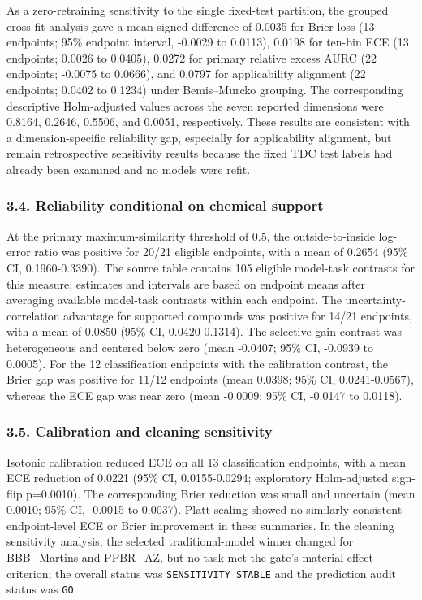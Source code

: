 \documentclass[
]{article}
\begin{document}
As a zero-retraining sensitivity to the single fixed-test partition, the
grouped cross-fit analysis gave a mean signed difference of 0.0035 for Brier
loss (13 endpoints; 95\% endpoint interval, -0.0029 to 0.0113), 0.0198 for
ten-bin ECE (13 endpoints; 0.0026 to 0.0405), 0.0272 for primary relative
excess AURC (22 endpoints; -0.0075 to 0.0666), and 0.0797 for applicability
alignment (22 endpoints; 0.0402 to 0.1234) under Bemis--Murcko grouping.
The corresponding descriptive Holm-adjusted values across the seven reported
dimensions were 0.8164, 0.2646, 0.5506, and 0.0051, respectively. These
results are consistent with a dimension-specific reliability gap, especially
for applicability alignment, but remain retrospective sensitivity results
because the fixed TDC test labels had already been examined and no models were
refit.

\subsubsection{3.4. Reliability conditional on chemical
support}\label{reliability-conditional-on-chemical-support}

At the primary maximum-similarity threshold of 0.5, the
outside-to-inside log-error ratio was positive for 20/21 eligible
endpoints, with a mean of 0.2654 (95\% CI, 0.1960-0.3390). The source
table contains 105 eligible model-task contrasts for this measure;
estimates and intervals are based on endpoint means after averaging
available model-task contrasts within each endpoint. The
uncertainty-correlation advantage for supported compounds was positive
for 14/21 endpoints, with a mean of 0.0850 (95\% CI, 0.0420-0.1314). The
selective-gain contrast was heterogeneous and centered below zero (mean
-0.0407; 95\% CI, -0.0939 to 0.0005). For the 12 classification
endpoints with the calibration contrast, the Brier gap was positive for
11/12 endpoints (mean 0.0398; 95\% CI, 0.0241-0.0567), whereas the ECE
gap was near zero (mean -0.0009; 95\% CI, -0.0147 to 0.0118).

\subsubsection{3.5. Calibration and cleaning
sensitivity}\label{calibration-and-cleaning-sensitivity}

Isotonic calibration reduced ECE on all 13 classification endpoints,
with a mean ECE reduction of 0.0221 (95\% CI, 0.0155-0.0294; exploratory
Holm-adjusted sign-flip p=0.0010). The corresponding Brier reduction was
small and uncertain (mean 0.0010; 95\% CI, -0.0015 to 0.0037). Platt
scaling showed no similarly consistent endpoint-level ECE or Brier
improvement in these summaries. In the cleaning sensitivity
analysis, the selected traditional-model winner changed for BBB\_Martins
and PPBR\_AZ, but no task met the gate's material-effect criterion; the
overall status was \texttt{SENSITIVITY\_STABLE} and the prediction audit
status was \texttt{GO}.
\end{document}
